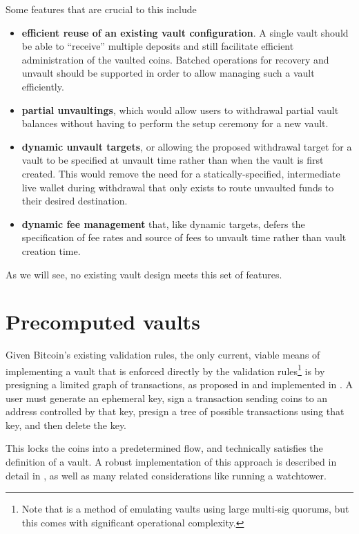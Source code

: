 \documentclass[10pt]{article}
\begin{document}
Some features that are crucial to this include

\begin{itemize}
  \item \textbf{efficient reuse of an existing vault configuration}. A single vault
    \spk{} should be able to ``receive'' multiple deposits and still facilitate
    efficient administration of the vaulted coins. Batched operations for recovery and
    unvault should be supported in order to allow managing such a vault efficiently.

  \item \textbf{partial unvaultings}, which would allow users to withdrawal partial vault
    balances without having to perform the setup ceremony for a new vault.

  \item \textbf{dynamic unvault targets}, or allowing the proposed withdrawal target
    for a vault to be specified at unvault time rather than when the vault is first
    created. This would remove the need for a statically-specified, intermediate live
    wallet during withdrawal that only exists to route unvaulted funds to their desired
    destination. 

  \item \textbf{dynamic fee management} that, like dynamic targets, defers the
    specification of fee rates and source of fees to
    unvault time rather than vault creation time.
\end{itemize}

As we will see, no existing vault design meets this set of features.

\section*{Precomputed vaults}

Given Bitcoin's existing validation rules, the only current, viable means of
implementing a vault that is enforced directly by the validation rules\footnote{Note
that \cite{Revault} is a method of emulating vaults using large multi-sig quorums, but
this comes with significant operational complexity.} is by presigning a limited graph
of transactions, as proposed in \cite{Bishop} and implemented in \cite{BishopCode}. A user must generate an ephemeral key,
sign a transaction sending coins to an address controlled by that key, presign a
tree of possible transactions using that key, and then delete the key. 

This locks the coins into a predetermined flow, and technically satisfies the
definition of a vault. A robust implementation of this approach is described in detail
in \cite{Swambo}, as well as many related considerations like running a watchtower.
\end{document}
